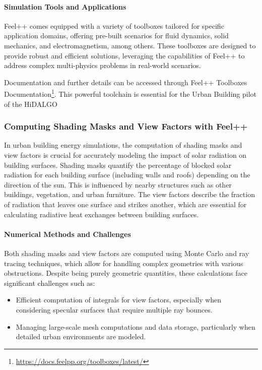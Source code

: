 \documentclass[runningheads]{llncs}
\begin{document}
\paragraph{Simulation Tools and Applications}
Feel++ comes equipped with a variety of toolboxes tailored for specific application domains, offering pre-built scenarios for fluid dynamics, solid mechanics, and electromagnetism, among others. These toolboxes are designed to provide robust and efficient solutions, leveraging the capabilities of Feel++ to address complex multi-physics problems in real-world scenarios.

Documentation and further details can be accessed through Feel++ Toolboxes Documentation\footnote{\url{https://docs.feelpp.org/toolboxes/latest/}}.
This powerful toolchain is essential for the Urban Building pilot of the HiDALGO

\subsubsection{Computing Shading Masks and View Factors with Feel++}

In urban building energy simulations, the computation of shading masks and view factors is crucial for accurately modeling the impact of solar radiation on building surfaces. Shading masks quantify the percentage of blocked solar radiation for each building surface (including walls and roofs) depending on the direction of the sun. This is influenced by nearby structures such as other buildings, vegetation, and urban furniture. The view factors describe the fraction of radiation that leaves one surface and strikes another, which are essential for calculating radiative heat exchanges between building surfaces.

\paragraph{Numerical Methods and Challenges}
Both shading masks and view factors are computed using Monte Carlo and ray tracing techniques, which allow for handling complex geometries with various obstructions. Despite being purely geometric quantities, these calculations face significant challenges such as:
\begin{itemize}
    \item Efficient computation of integrals for view factors, especially when considering specular surfaces that require multiple ray bounces.
    \item Managing large-scale mesh computations and data storage, particularly when detailed urban environments are modeled.
\end{itemize}
\end{document}

